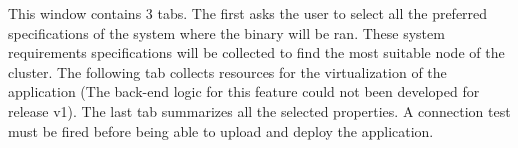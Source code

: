                 This window contains 3 tabs. The first asks the user to select all the preferred specifications of the system where the binary will be ran. These system requirements specifications will be collected to find the most suitable node of the cluster.
                The following tab collects resources for the virtualization of the application (The back-end logic for this feature could not been developed for release v1).
                The last tab summarizes all the selected properties. A connection test must be fired before being able to upload and deploy the application.